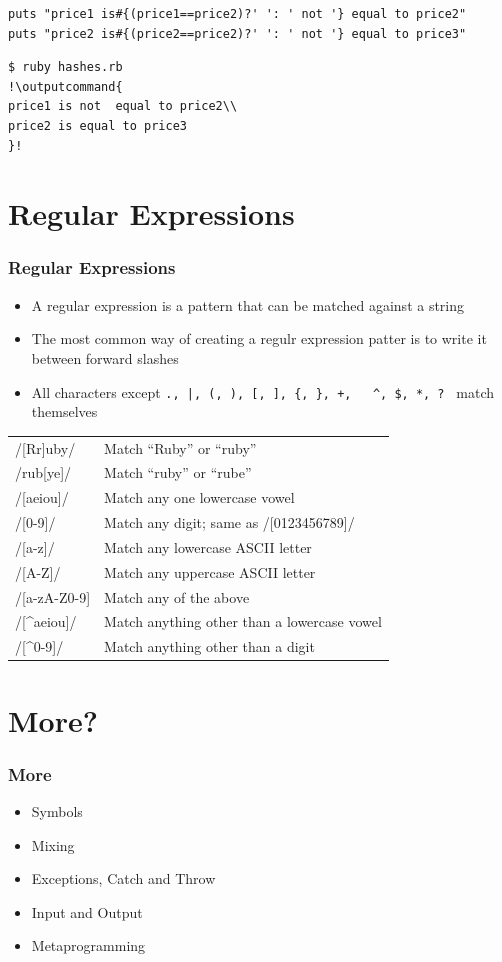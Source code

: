 \documentclass{beamer}
\newcommand{\outputcommand}[1]{\color{darkgreen}{#1}}
\begin{document}
\begin{frame}
\begin{itemize}
\begin{lstlisting}[escapechar=&]
puts "price1 is#{(price1==price2)?' ': ' not '} equal to price2"
puts "price2 is#{(price2==price2)?' ': ' not '} equal to price3"
\end{lstlisting}

\lstset{language=shell}
\begin{lstlisting}[numbers=none, escapechar=!]
$ ruby hashes.rb
!\outputcommand{
price1 is not  equal to price2\\
price2 is equal to price3
}!
\end{lstlisting}
\end{itemize}

\end{frame}
\section{Regular Expressions}
\begin{frame}
\frametitle{Regular Expressions}
\begin{itemize}
 \item A regular expression is a pattern that can be matched against a string
 \item The most common way of creating a regulr expression patter is to write it between forward slashes
 \item All characters except \texttt{., |, (, ), [, ], \{, \}, +, \, \^{}, \$, *, ? } match themselves
\end{itemize}
\pagebreak
 \begin{tabular}{ll}
/[Rr]uby/  & Match ``Ruby'' or ``ruby''\\
/rub[ye]/ & Match ``ruby'' or ``rube''\\
/[aeiou]/ & Match any one lowercase vowel\\
/[0-9]/ & Match any digit; same as /[0123456789]/\\
/[a-z]/   & Match any lowercase ASCII letter\\
/[A-Z]/   & Match any uppercase ASCII letter\\
/[a-zA-Z0-9] & Match any of the above\\
/[\^{}aeiou]/  & Match anything other than a lowercase vowel\\
/[\^{}0-9]/ & Match anything other than a digit\\
 \end{tabular} 
\end{frame}
\section{More? }
\begin{frame}[fragile]
\frametitle{More}
\begin{itemize}
 \item Symbols
 \item Mixing
 \item Exceptions, Catch and Throw
 \item Input and Output
 \item Metaprogramming
\end{itemize}
\end{frame}
\end{document}
